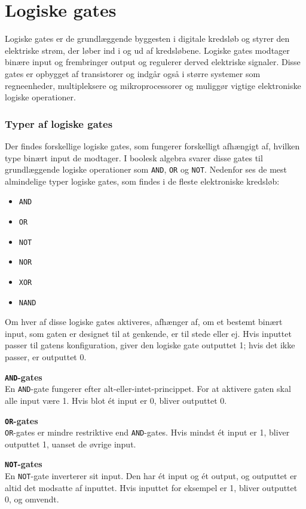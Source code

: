 \section{Logiske gates}
Logiske gates er de grundlæggende byggesten i digitale kredsløb og styrer den elektriske strøm, der løber ind i og ud af kredsløbene. Logiske gates modtager binære input og frembringer output og regulerer derved elektriske signaler. Disse gates er opbygget af transistorer og indgår også i større systemer som regneenheder, multipleksere og mikroprocessorer og muliggør vigtige elektroniske logiske operationer.

\subsubsection*{Typer af logiske gates}
Der findes forskellige logiske gates, som fungerer forskelligt afhængigt af, hvilken type binært input de modtager. I boolesk algebra svarer disse gates til grundlæggende logiske operationer som \texttt{AND}, \texttt{OR} og \texttt{NOT}. Nedenfor ses de mest almindelige typer logiske gates, som findes i de fleste elektroniske kredsløb:

\begin{itemize}
    \item \texttt{AND}
    \item \texttt{OR}
    \item \texttt{NOT}
    \item \texttt{NOR}
    \item \texttt{XOR}
    \item \texttt{NAND}    
\end{itemize}

Om hver af disse logiske gates aktiveres, afhænger af, om et bestemt binært input, som gaten er designet til at genkende, er til stede eller ej. Hvis inputtet passer til gatens konfiguration, giver den logiske gate outputtet 1; hvis det ikke passer, er outputtet 0.

\textbf{\texttt{AND}-gates}\\
En \texttt{AND}-gate fungerer efter alt-eller-intet-princippet. For at aktivere gaten skal alle input være 1. Hvis blot ét input er 0, bliver outputtet 0.

\textbf{\texttt{OR}-gates}\\
\texttt{OR}-gates er mindre restriktive end \texttt{AND}-gates. Hvis mindst ét input er 1, bliver outputtet 1, uanset de øvrige input.

\textbf{\texttt{NOT}-gates}\\
En \texttt{NOT}-gate inverterer sit input. Den har ét input og ét output, og outputtet er altid det modsatte af inputtet. Hvis inputtet for eksempel er 1, bliver outputtet 0, og omvendt.

